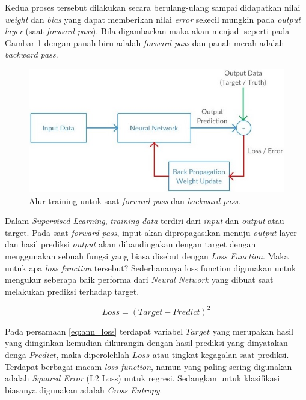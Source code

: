 Kedua proses tersebut dilakukan secara berulang-ulang sampai didapatkan nilai \textit{weight} dan \textit{bias} yang dapat memberikan nilai \textit{error} sekecil mungkin pada \textit{output layer} (saat \textit{forward pass}). Bila digambarkan maka akan menjadi seperti pada Gambar \ref{fig:ann_backpro} dengan panah biru adalah \textit{forward pass} dan panah merah adalah \textit{backward pass}.

\begin{figure} [!h] \centering
	\includegraphics[scale=0.8]{img/ann_backpro.jpeg}
	\caption{Alur training untuk saat \textit{forward pass} dan \textit{backward pass}.}
	\label{fig:ann_backpro}
\end{figure}

Dalam \textit{Supervised Learning}, \textit{training data} terdiri dari \textit{input} dan \textit{output} atau target. Pada saat \textit{forward pass}, input akan dipropagasikan menuju \textit{output} layer dan hasil prediksi \textit{output} akan dibandingakan dengan target dengan menggunakan sebuah fungsi yang biasa disebut dengan \textit{Loss Function}. Maka untuk apa \textit{loss function} tersebut? Sederhananya loss function digunakan untuk mengukur seberapa baik performa dari \textit{Neural Network} yang dibuat saat melakukan prediksi terhadap target.
\vspace{1ex}

\begin{equation}\label{eq:ann_loss}
Loss = (Target - Predict)^{2}
\end{equation}

Pada persamaan \ref{eq:ann_loss} terdapat variabel $Target$ yang merupakan hasil yang diinginkan kemudian dikurangin dengan hasil prediksi yang dinyatakan denga $Predict$, maka diperolehlah $Loss$ atau tingkat kegagalan saat prediksi. Terdapat berbagai macam \textit{loss function}, namun yang paling sering digunakan adalah \textit{Squared Error} (L2 Loss) untuk regresi. Sedangkan untuk klasifikasi biasanya digunakan adalah \textit{Cross Entropy}.